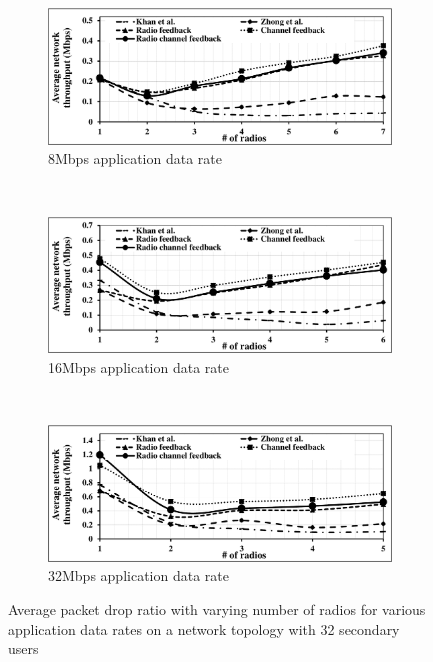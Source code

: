 \begin{landscape}
\begin{figure}[!htbp]
\begin{subfigure}[t]{0.625\textwidth}
        \includegraphics[width=\textwidth]{alltopology/32Throughput24d8}
        \caption{8Mbps application data rate}
    \end{subfigure}
    ~\\
    \begin{subfigure}[t]{0.625\textwidth}
        \includegraphics[width=\textwidth]{alltopology/32Throughput24d16}
        \caption{16Mbps application data rate}
    \end{subfigure}
    ~
    \begin{subfigure}[t]{0.625\textwidth}
        \includegraphics[width=\textwidth]{alltopology/32Throughput24d32}
        \caption{32Mbps application data rate}
    \end{subfigure}
    \caption{Average packet drop ratio with varying number of radios for various application data rates on a network topology with 32 secondary users}
\end{figure}
\end{landscape}
